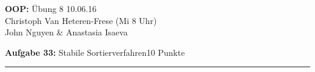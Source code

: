 \documentclass[a4paper, 12pt]{article}
\newcommand{\TITLE}[3]{\Large\textbf{#1:} \"Ubung #2 \hfill #3\\[3pt]}
\newcommand{\TUTOR}[3]{\normalsize{#1 (#2 #3 Uhr)}}
\newcommand{\AUTHOR}{\normalsize{John Nguyen \& Anastasia Isaeva}}
\newcommand{\AUFGABE}[3]{
\vspace{1.5cm}
\noindent\large\textbf{Aufgabe #1: }{#2}\hfill\small#3 Punkte\\[-5pt]
\rule{\textwidth}{0.4pt}\\}
\begin{document}
\noindent\TITLE{OOP}{8}{10.06.16}
\TUTOR{Christoph Van Heteren-Frese}{Mi}{8}\\
\AUTHOR

\AUFGABE{33}{Stabile Sortierverfahren}{10}
\end{document}

